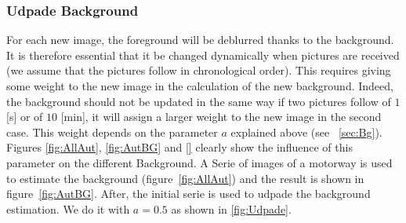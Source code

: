 \subsubsection{Udpade Background}
\label{subsec:UdpadeBg}

For each new image, the foreground will be deblurred thanks to the background. It is therefore essential that it be changed dynamically when pictures are received (we assume that the pictures follow in chronological order). This requires giving some weight to the new image in the calculation of the new background. Indeed, the background should not be updated in the same way if two pictures follow of $1$ [s] or of $10$ [min], it will assign a larger weight to the new image in the second case. This weight depends on the parameter $a$ explained above (see ~\ref{sec:Bg}). Figures \ref{fig:AllAut}, \ref{fig:AutBG} and \ref{} clearly show the influence of this parameter on the different Background. A Serie of images of a motorway is used to estimate the background (figure~\ref{fig:AllAut}) and the result is shown in figure~\ref{fig:AutBG}. After, the initial serie is used to udpade the background estimation. We do it with $a=0.5$ as shown in \ref{fig:Udpade}.

